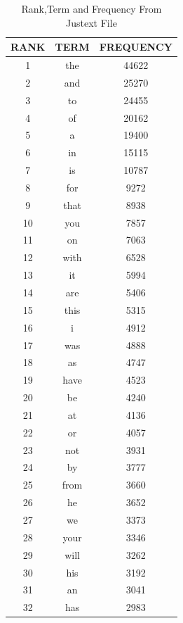\documentclass{article}
\begin{document}
\begin{table}

\caption{  Rank,Term and Frequency From Justext File}

\begin{center}

  \begin{tabular}{ c | c | c }

    \hline

RANK & TERM & FREQUENCY \\ \hline
1 & the & 44622 \\ \hline
2 & and & 25270 \\ \hline
3 & to & 24455 \\ \hline
4 & of & 20162 \\ \hline
5 & a & 19400 \\ \hline
6 & in & 15115 \\ \hline
7 & is & 10787 \\ \hline
8 & for & 9272 \\ \hline
9 & that & 8938 \\ \hline
10 & you & 7857 \\ \hline
11 & on & 7063 \\ \hline
12 & with & 6528 \\ \hline
13 & it & 5994 \\ \hline
14 & are & 5406 \\ \hline
15 & this & 5315 \\ \hline
16 & i & 4912 \\ \hline
17 & was & 4888 \\ \hline
18 & as & 4747 \\ \hline
19 & have & 4523 \\ \hline
20 & be & 4240 \\ \hline
21 & at & 4136 \\ \hline
22 & or & 4057 \\ \hline
23 & not & 3931 \\ \hline
24 & by & 3777 \\ \hline
25 & from & 3660 \\ \hline
26 & he & 3652 \\ \hline
27 & we & 3373 \\ \hline
28 & your & 3346 \\ \hline
29 & will & 3262 \\ \hline
30 & his & 3192 \\ \hline
31 & an & 3041 \\ \hline
32 & has & 2983 \\ \hline

\end{tabular}
\end{center}
\end{table}
\end{document}
